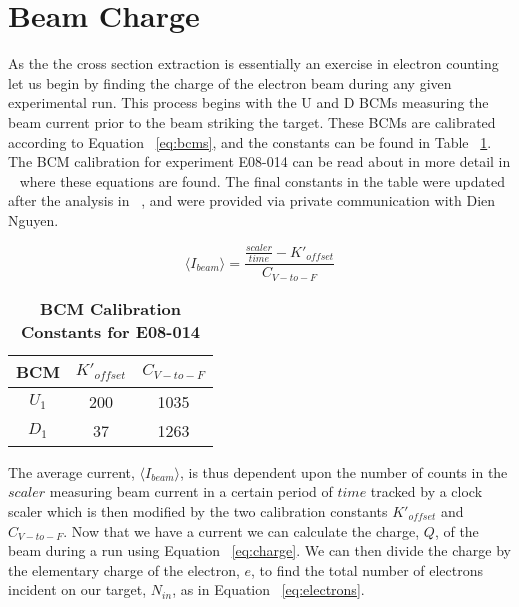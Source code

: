 \section{Beam Charge}
\label{sec:charge}

As the the cross section extraction is essentially an exercise in electron counting let us begin by finding the charge of the electron beam during any given experimental run. This process begins with the U and D BCMs measuring the beam current prior to the beam striking the target. These BCMs are calibrated according to Equation ~\ref{eq:bcms}, and the constants can be found in Table ~\ref{tab:bcm_constants}. The BCM calibration for experiment E08-014 can be read about in more detail in ~\cite{bcm_calibration} where these equations are found. The final constants in the table were updated after the analysis in ~\cite{bcm_calibration}, and were provided via private communication with Dien Nguyen.

\begin{equation} \label{eq:bcms}
	\langle I_{beam} \rangle = \frac{\frac{scaler}{time}-K'_{offset}}{C_{V-to-F}}
\end{equation}

\begin{table}[!h]
\centering
\begin{tabular}{|c c c|}
\hline
\textbf{BCM} & \textbf{$K'_{offset}$} & \textbf{$C_{V-to-F}$} \\
\hline
$U_1$ & 200 & 1035 \\
$D_1$ & 37 & 1263\\
\hline
\end{tabular}
\caption{\bf{BCM Calibration Constants for E08-014}}
\label{tab:bcm_constants}
\end{table}

The average current, $\langle I_{beam} \rangle$, is thus dependent upon the number of counts in the $scaler$ measuring beam current in a certain period of $time$ tracked by a clock scaler which is then modified by the two calibration constants $K'_{offset}$ and $C_{V-to-F}$. Now that we have a current we can calculate the charge, $Q$, of the beam during a run using Equation ~\ref{eq:charge}. We can then divide the charge by the elementary charge of the electron, $e$, to find the total number of electrons incident on our target, $N_{in}$, as in Equation ~\ref{eq:electrons}.

